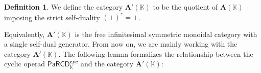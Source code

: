 \documentclass{amsart}
\newcommand{\bT}{\mathbf{T}}
\newcommand{\bA}{\mathbf{A}}
\newcommand{\kk}{\mathbb{K}}    %
\newcommand{\PaRB}{\mathsf{PaRB}}
\newcommand{\PaRCD}{\mathsf{PaRCD}}
\newcommand{\hPaRCD}{{\PaRCD}_{\kk}}
\newcommand{\cyc}{\mathbf{cyc}}
\theoremstyle{definition}
\newtheorem{definition}[theorem]{Definition}%
\numberwithin{equation}{section}
\begin{document}
\begin{definition}
We define the category $\bA'(\kk)$ to be the quotient of $\bA(\kk)$ imposing the strict self-duality $(+)^* = +$.    
\end{definition}
Equivalently, $\bA'(\kk)$ is the free infinitesimal symmetric monoidal category with a single self-dual generator. From now on, we are mainly working with the category $\bA'(\kk)$. The following lemma formalizes the relationship between the cyclic operad $\hPaRCD^{\cyc}$ and the category $\bA'(\kk)$:

\end{document}

